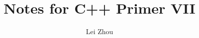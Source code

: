 \documentclass{article}
\begin{document}
\title{Notes for C++ Primer VII}
\author{Lei Zhou}
\maketitle

%

%

%

%

%

%


\end{document}
